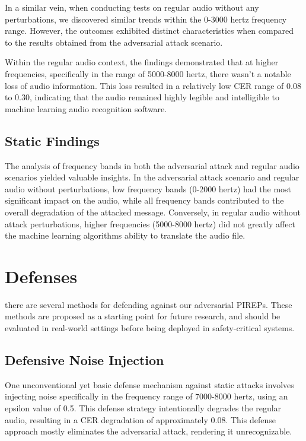 \documentclass[11pt,a4paper]{article}
\begin{document}
In a similar vein, when conducting tests on regular audio without any
perturbations, we discovered similar trends within the 0-3000 hertz frequency
range. However, the outcomes exhibited distinct characteristics when compared to
the results obtained from the adversarial attack scenario.

Within the regular audio context, the findings demonstrated that at higher
frequencies, specifically in the range of 5000-8000 hertz, there wasn't a
notable loss of audio information. This loss resulted in a relatively low CER
range of 0.08 to 0.30, indicating that the audio remained highly legible and
intelligible to machine learning audio recognition software.

\subsection{Static Findings}

The analysis of frequency bands in both the adversarial attack and regular audio
scenarios yielded valuable insights. In the adversarial attack scenario and
regular audio without perturbations, low frequency bands (0-2000 hertz) had the
most significant impact on the audio, while all frequency bands contributed to
the overall degradation of the attacked message. Conversely, in regular audio
without attack perturbations, higher frequencies (5000-8000 hertz) did not
greatly affect the machine learning algorithms ability to translate the audio
file.

\section{Defenses}

there are several methods for defending against our adversarial PIREPs. These
methods are proposed as a starting point for future research, and should be
evaluated in real-world settings before being deployed in safety-critical
systems.

\subsection{Defensive Noise Injection}

One unconventional yet basic defense mechanism against static attacks involves
injecting noise specifically in the frequency range of 7000-8000 hertz, using an
epsilon value of 0.5. This defense strategy intentionally degrades the regular
audio, resulting in a CER degradation of approximately 0.08. This defense
approach mostly eliminates the adversarial attack, rendering it unrecognizable.
\end{document}
